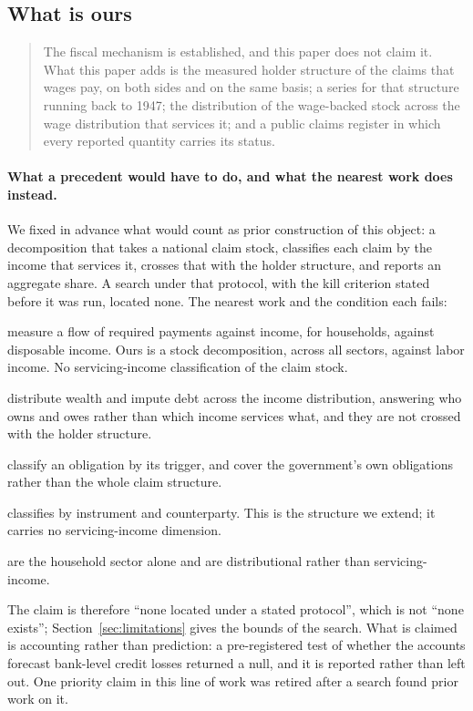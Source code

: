 \subsection{What is ours}

\begin{quote}
The fiscal mechanism is established, and this paper does not claim it. What this paper adds is
the measured holder structure of the claims that wages pay, on both sides and on the same basis;
a series for that structure running back to 1947; the distribution of the wage-backed stock
across the wage distribution that services it; and a public claims register in which every
reported quantity carries its status.
\end{quote}

\paragraph{What a precedent would have to do, and what the nearest work does instead.} We fixed
in advance what would count as prior construction of this object: a decomposition that takes a
national claim stock, classifies each claim by the income that services it, crosses that with the
holder structure, and reports an aggregate share. A search under that protocol, with the kill
criterion stated before it was run, located none. The nearest work and the condition each fails:

\begin{description}[leftmargin=2.2em,style=nextline,itemsep=2pt]
  \item[Debt service ratios] measure a flow of required payments against income, for households,
  against disposable income. Ours is a stock decomposition, across all sectors, against labor
  income. No servicing-income classification of the claim stock.
  \item[Distributional national accounts] \citep{BattyEtAl2019} distribute wealth and impute debt
  across the income distribution, answering who owns and owes rather than which income services
  what, and they are not crossed with the holder structure.
  \item[Fiscal risk matrices] \citep{Polackova1998,Cebotari2008} classify an obligation by its
  trigger, and cover the government's own obligations rather than the whole claim structure.
  \item[Who-to-whom accounting] \citep{Copeland1952,FRBZ1} classifies by instrument and
  counterparty. This is the structure we extend; it carries no servicing-income dimension.
  \item[Household debt histories] \citep{BartscherKuhnSchularickSteins2020} are the household
  sector alone and are distributional rather than servicing-income.
\end{description}

The claim is therefore ``none located under a stated protocol'', which is not ``none exists'';
Section~\ref{sec:limitations} gives the bounds of the search. What is claimed is accounting rather
than prediction: a pre-registered test of whether the accounts forecast bank-level credit losses
returned a null, and it is reported rather than left out. One priority claim in this line of work
was retired after a search found prior work on it.
